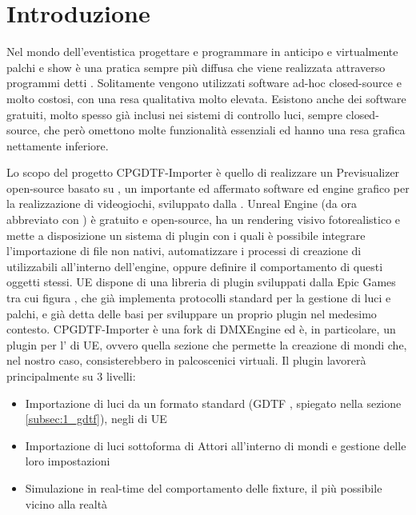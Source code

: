 \documentclass[main.tex]{subfiles}
\begin{document}
\sloppy


\vspace{1.0cm}

\section{Introduzione}\label{sec:Intro}
Nel mondo dell'eventistica progettare e programmare in anticipo e virtualmente palchi e show è una pratica sempre più diffusa che viene realizzata attraverso programmi detti . Solitamente vengono utilizzati software\cite{capture} ad-hoc closed-source e molto costosi, con una resa qualitativa molto elevata. Esistono anche dei software gratuiti, molto spesso già inclusi nei sistemi di controllo luci, sempre closed-source, che però omettono molte funzionalità essenziali ed hanno una resa grafica nettamente inferiore.\newline

Lo scopo del progetto CPGDTF-Importer è quello di realizzare un Previsualizer open-source basato su \cite{UnrealEngine}, un importante ed affermato software ed engine grafico per la realizzazione di videogiochi, sviluppato dalla . Unreal Engine (da ora abbreviato con ) è gratuito e open-source, ha un rendering visivo fotorealistico e mette a disposizione un sistema di plugin con i quali è possibile integrare l'importazione di file non nativi, automatizzare i processi di creazione di  utilizzabili all'interno dell'engine, oppure definire il comportamento di questi oggetti stessi. UE dispone di una libreria di plugin sviluppati dalla Epic Games tra cui figura , che già implementa protocolli standard per la gestione di luci e palchi, e già detta delle basi per sviluppare un proprio plugin nel medesimo contesto.  
\newline
CPGDTF-Importer è una fork di DMXEngine ed è, in particolare, un plugin per l' di UE, ovvero quella sezione che permette la creazione di mondi che, nel nostro caso, consisterebbero in palcoscenici virtuali. Il plugin lavorerà principalmente su 3 livelli:
\begin{itemize}
    \item Importazione di luci da un formato standard (GDTF \cite{GDTF}, spiegato nella sezione \ref{subsec:1_gdtf}), negli  di UE
    \item Importazione di luci sottoforma di Attori all'interno di mondi e gestione delle loro impostazioni
    \item Simulazione in real-time del comportamento delle fixture, il più possibile vicino alla realtà
\end{itemize}
\end{document}
